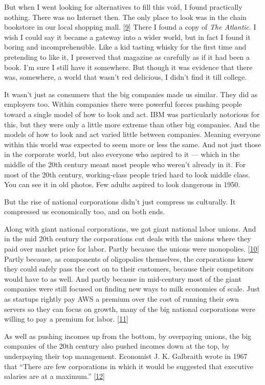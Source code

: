 But when I went looking for alternatives to fill this void, I found
practically nothing. There was no Internet then. The only place to look
was in the chain bookstore in our local shopping mall.
{[}\hyperref[f9n]{9}{]} There I found a copy of \emph{The Atlantic}. I
wish I could say it became a gateway into a wider world, but in fact I
found it boring and incomprehensible. Like a kid tasting whisky for the
first time and pretending to like it, I preserved that magazine as
carefully as if it had been a book. I'm sure I still have it somewhere.
But though it was evidence that there was, somewhere, a world that
wasn't red delicious, I didn't find it till college.

It wasn't just as consumers that the big companies made us similar. They
did as employers too. Within companies there were powerful forces
pushing people toward a single model of how to look and act. IBM was
particularly notorious for this, but they were only a little more
extreme than other big companies. And the models of how to look and act
varied little between companies. Meaning everyone within this world was
expected to seem more or less the same. And not just those in the
corporate world, but also everyone who aspired to it --- which in the
middle of the 20th century meant most people who weren't already in it.
For most of the 20th century, working-class people tried hard to look
middle class. You can see it in old photos. Few adults aspired to look
dangerous in 1950.

But the rise of national corporations didn't just compress us
culturally. It compressed us economically too, and on both ends.

Along with giant national corporations, we got giant national labor
unions. And in the mid 20th century the corporations cut deals with the
unions where they paid over market price for labor. Partly because the
unions were monopolies. {[}\hyperref[f10n]{10}{]} Partly because, as
components of oligopolies themselves, the corporations knew they could
safely pass the cost on to their customers, because their competitors
would have to as well. And partly because in mid-century most of the
giant companies were still focused on finding new ways to milk economies
of scale. Just as startups rightly pay AWS a premium over the cost of
running their own servers so they can focus on growth, many of the big
national corporations were willing to pay a premium for labor.
{[}\hyperref[f11n]{11}{]}

As well as pushing incomes up from the bottom, by overpaying unions, the
big companies of the 20th century also pushed incomes down at the top,
by underpaying their top management. Economist J. K. Galbraith wrote in
1967 that ``There are few corporations in which it would be suggested
that executive salaries are at a maximum.'' {[}\hyperref[f12n]{12}{]}

